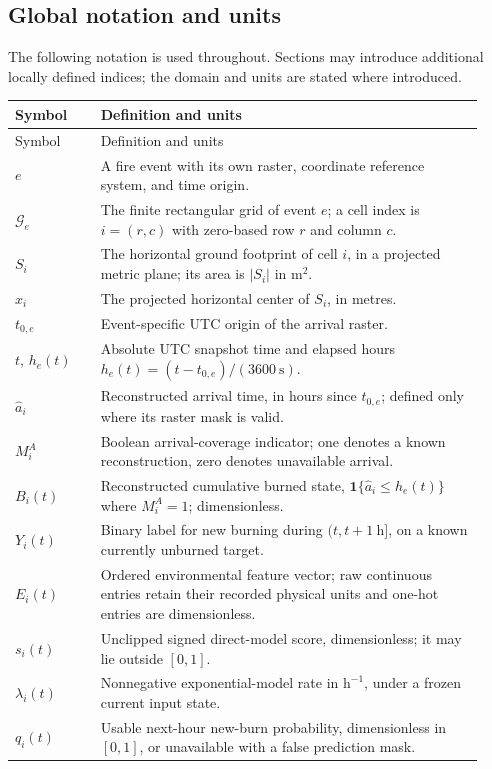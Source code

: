 \documentclass[11pt,a4paper]{article}
\newcommand{\Ind}{\mathbf{1}}
\begin{document}
\subsection{Global notation and units}
\label{sec:notation}
The following notation is used throughout. Sections may introduce additional
locally defined indices; the domain and units are stated where introduced.
\begin{longtable}{@{}P{0.17\linewidth}P{0.76\linewidth}@{}}
\toprule Symbol & Definition and units\\\midrule
\endfirsthead
\toprule Symbol & Definition and units\\\midrule
\endhead
$e$ & A fire event with its own raster, coordinate reference system, and time origin.\\
$\mathcal G_e$ & The finite rectangular grid of event $e$; a cell index is $i=(r,c)$ with zero-based row $r$ and column $c$.\\
$S_i$ & The horizontal ground footprint of cell $i$, in a projected metric plane; its area is $|S_i|$ in $\mathrm{m^2}$.\\
$x_i$ & The projected horizontal center of $S_i$, in metres.\\
$t_{0,e}$ & Event-specific UTC origin of the arrival raster.\\
$t$, $h_e(t)$ & Absolute UTC snapshot time and elapsed hours $h_e(t)=(t-t_{0,e})/(3600\ \mathrm{s})$.\\
$\widehat a_i$ & Reconstructed arrival time, in hours since $t_{0,e}$; defined only where its raster mask is valid.\\
$M_i^A$ & Boolean arrival-coverage indicator; one denotes a known reconstruction, zero denotes unavailable arrival.\\
$B_i(t)$ & Reconstructed cumulative burned state, $\Ind\{\widehat a_i\le h_e(t)\}$ where $M_i^A=1$; dimensionless.\\
$Y_i(t)$ & Binary label for new burning during $(t,t+1\ \mathrm{h}]$, on a known currently unburned target.\\
$E_i(t)$ & Ordered environmental feature vector; raw continuous entries retain their recorded physical units and one-hot entries are dimensionless.\\
$s_i(t)$ & Unclipped signed direct-model score, dimensionless; it may lie outside $[0,1]$.\\
$\lambda_i(t)$ & Nonnegative exponential-model rate in $\mathrm{h^{-1}}$, under a frozen current input state.\\
$q_i(t)$ & Usable next-hour new-burn probability, dimensionless in $[0,1]$, or unavailable with a false prediction mask.\\

\end{longtable}
\end{document}
